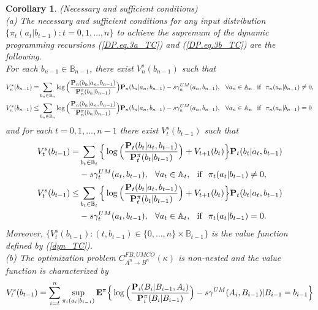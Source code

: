 \documentclass[11pt, a4paper, journal,onecolumn]{IEEEtran}
\newcommand{\mb}{\mathbb}
\newcommand{\rar}{\rightarrow}
\newcommand{\hso}{\hspace{.1in}}
\newtheorem{corollary}{Corollary}[section]
\begin{document}
\begin{corollary}(Necessary and sufficient conditions)\label{nessufco_TC}{\ \\}
(a) The necessary and sufficient conditions for any input distribution $\{\pi_t(a_t|b_{t-1}):t=0,1,\ldots,n\}$ to achieve the supremum of the dynamic programming recursions (\ref{DP.eq.3a_TC}) and (\ref{DP.eq.3b_TC})  are the following. \\
 For each $b_{n-1}\in {\mb B}_{n-1}$, there exist $V_n^s(b_{n-1})$ such that 
\begin{align}
 V_n^s(b_{n-1}) =& \sum_{b_{n}\in {\mb B}_n}\log\Big(\frac{{\bf P}_n(b_n|a_n,b_{n-1})}{{\bf P}^{\pi}_{n}(b_n|b_{n-1})}\Big){\bf P}_n(b_n|a_n,b_{n-1}) -s\gamma_n^{UM}(a_n,b_{n-1}), \hso   \forall{a_n}\in{\mb A}_n \hso \mbox{if} \hso \pi_n(a_n|b_{n-1})\neq{0},  \label{suff_equa_ter_con_TC}\\
V_n^s(b_{n-1}) \leq & \sum_{b_{n}\in {\mb B}_n}\log\Big(\frac{{\bf P}_n(b_n|a_n,b_{n-1})}{{\bf P}^{\pi}_{n}(b_n|b_{n-1})}\Big){\bf P}_n(b_n|a_n,b_{n-1}) -s\gamma_n^{UM}(a_n,b_{n-1}), \hso   \forall{a_n}\in{\mb A}_n \hso \mbox{if} \hso \pi_n(a_n|b_{n-1})={0}  \label{suff_equa_ter_con_a_TC}
\end{align}
and for each $t=0,1,\ldots,n-1$ there exist $V_t^s(b_{t-1})$ such that    
\begin{align}
 V_t^s(b_{t-1}) = & \sum_{b_{t} \in {\mb B}_t}\Big\{\log\Big(\frac{{\bf P}_t(b_t|a_t,b_{t-1})}{{\bf P}_t^{\pi}(b_t|b_{t-1})}\Big)+V_{t+1}(b_{t})\Big\}{\bf P}_t(b_t|a_t,b_{t-1})\nonumber \\
 & -s\gamma_t^{UM}(a_t,b_{t-1}), \hso \forall {a_t}\in{\mb A}_t, \hso \mbox{if}  \hso \pi_t(a_t|b_{t-1})\neq{0}, \label{suff_equa_TC}\\
 V_t^s(b_{t-1}) \leq & \sum_{b_{t}\in {\mb B}_t}\Big\{\log\Big(\frac{{\bf P}_t(b_t|a_t,b_{t-1})}{{\bf P}_t^{\pi}(b_t|b_{t-1})}\Big)+V_{t+1}(b_{t})\Big\}{\bf P}_t(b_t|a_t,b_{t-1})\nonumber \\
 &-s\gamma_t^{UM}(a_t,b_{t-1}), \hso \forall {a_t}\in{\mb A}_t, \hso \mbox{if}  \hso \pi_t(a_t|b_{t-1})={0}. \label{suff_equa_a_TC}
\end{align}
 Moreover, $\{V_t^s(b_{t-1}): (t, b_{t-1})\in \{0, \ldots, n\}\times {\mb B}_{t-1}\}$ is the value function  defined by (\ref{dyn_TC}).\\
(b) The optimization problem  $C_{A^n \rar B^n}^{FB,UMCO}(\kappa)$ is non-nested and the value function is characterized by  
\begin{align}
V_t^s(b_{t-1})=\sum_{i=t}^n \sup_{\pi_i(a_i|b_{i-1})}{\bf E}^\pi\Big\{\log\Big(\frac{{\bf P}_i(B_i|B_{i-1},A_i)}{{\bf P}_i^\pi(B_i|B_{i-1})}\Big)-s \gamma^{UM}(A_i, B_{i-1})|B_{i-1}=b_{i-1}\Big\} \label{dyn_TC_NN}

\end{align}
\end{corollary}
\end{document}
